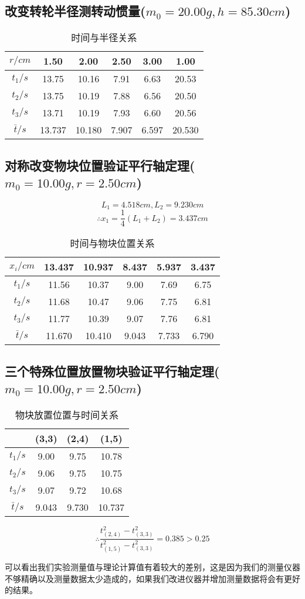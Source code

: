 \documentclass[a4 paper,12pt]{article}
\begin{document}
\subsection{改变转轮半径测转动惯量($m_{0}=20.00g,h=85.30cm$)}
\begin{table}[H]
	\centering
	\caption{时间与半径关系}
	\label{时间与半径关系}
	\begin{tabular}{c|*{5}{c}}
		\toprule[0.5mm]
		$r/cm$&1.50&2.00&2.50&3.00&1.00\\
		\midrule
		$t_{1}/s$&13.75&10.16&7.91&6.63&20.53\\
		$t_{2}/s$&13.75&10.19&7.88&6.56&20.50\\
		$t_{3}/s$&13.71&10.19&7.93&6.60&20.56\\
		$\bar{t}/s$&13.737&10.180&7.907&6.597&20.530\\
		\bottomrule[0.5mm]
	\end{tabular}
\end{table}
\subsection{对称改变物块位置验证平行轴定理($m_{0}=10.00g,r=2.50cm$)}
$$L_{1}=4.518cm,L_{2}=9.230cm$$
$$\therefore x_{1}=\dfrac{1}{4}(L_{1}+L_{2})=3.437cm$$
\begin{table}[H]
	\centering
	\caption{时间与物块位置关系}
	\label{时间与物块位置关系}
	\begin{tabular}{c|*{5}{c}}
		\toprule[0.5mm]
		$x_{i}/cm$&13.437&10.937&8.437&5.937&3.437\\
		\midrule
		$t_{1}/s$&11.56&10.37&9.00&7.69&6.75\\
		$t_{2}/s$&11.68&10.47&9.06&7.75&6.81\\
		$t_{3}/s$&11.77&10.39&9.07&7.76&6.81\\
		$\bar{t}/s$&11.670&10.410&9.043&7.733&6.790\\
		\bottomrule[0.5mm]
	\end{tabular}
\end{table}
\subsection{三个特殊位置放置物块验证平行轴定理($m_{0}=10.00g,r=2.50cm$)}
\begin{table}[H]
	\centering
	\caption{物块放置位置与时间关系}
	\label{物块放置位置与时间关系}
	\begin{tabular}{c|*{3}{c}}
		\toprule[0.5mm]
		&(3,3)&(2,4)&(1,5)\\
		\midrule
		$t_{1}/s$&9.00&9.75&10.78\\
		$t_{2}/s$&9.06&9.75&10.75\\
		$t_{3}/s$&9.07&9.72&10.68\\
		$\bar{t}/s$&9.043&9.730&10.737\\
		\bottomrule[0.5mm]
	\end{tabular}
\end{table}
$$\therefore\dfrac{t_{(2,4)}^{2}-t_{(3,3)}^{2}}{t_{(1,5)}^{2}-t_{(3,3)}^{2}}=0.385>0.25$$
\par 可以看出我们实验测量值与理论计算值有着较大的差别，这是因为我们的测量仪器不够精确以及测量数据太少造成的，如果我们改进仪器并增加测量数据将会有更好的结果。
\end{document}
